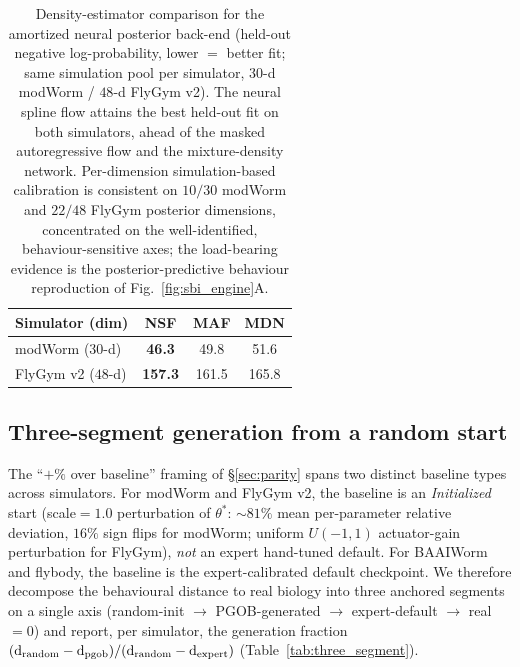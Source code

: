 \documentclass[11pt]{article}
\begin{document}
\begin{table}[H]
\centering\small
\caption{Density-estimator comparison for the amortized neural posterior back-end (held-out negative log-probability, lower $=$ better fit; same simulation pool per simulator, $30$-d modWorm / $48$-d FlyGym v2). The neural spline flow attains the best held-out fit on both simulators, ahead of the masked autoregressive flow and the mixture-density network. Per-dimension simulation-based calibration is consistent on $10/30$ modWorm and $22/48$ FlyGym posterior dimensions, concentrated on the well-identified, behaviour-sensitive axes; the load-bearing evidence is the posterior-predictive behaviour reproduction of Fig.~\ref{fig:sbi_engine}A.}
\label{tab:sbi_baseline}
\begin{tabular}{lccc}\toprule
Simulator (dim) & NSF & MAF & MDN \\\midrule
modWorm ($30$-d) & \textbf{46.3} & 49.8 & 51.6 \\
FlyGym v2 ($48$-d) & \textbf{157.3} & 161.5 & 165.8 \\\bottomrule
\end{tabular}
\end{table}

\subsection{Three-segment generation from a random start}
\label{sec:three_segment}

The ``$+\%$ over baseline'' framing of \S\ref{sec:parity} spans two distinct baseline types across simulators. For modWorm and FlyGym v2, the baseline is an \emph{Initialized} start (scale${=}1.0$ perturbation of $\theta^{*}$: $\sim 81\%$ mean per-parameter relative deviation, $16\%$ sign flips for modWorm; uniform $U(-1,1)$ actuator-gain perturbation for FlyGym), \emph{not} an expert hand-tuned default. For BAAIWorm and flybody, the baseline is the expert-calibrated default checkpoint. We therefore decompose the behavioural distance to real biology into three anchored segments on a single axis (random-init $\to$ PGOB-generated $\to$ expert-default $\to$ real$=0$) and report, per simulator, the generation fraction $(\mathrm{d}_{\rm random}-\mathrm{d}_{\rm pgob})/(\mathrm{d}_{\rm random}-\mathrm{d}_{\rm expert})$ (Table~\ref{tab:three_segment}).
\end{document}
